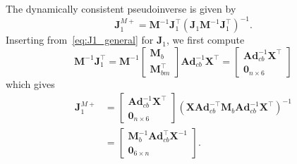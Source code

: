 \documentclass[../main.tex]{subfiles}
\begin{document}
\appendix
\section{}%
The dynamically consistent pseudoinverse is given by
\begin{equation}
    \bm{J}_1^{M+} = \bm{M}^{-1} \bm{J}_1^\top \left( \bm{J}_1 \bm{M}^{-1} \bm{J}_1^\top \right)^{-1}.
\end{equation}
Inserting from~\eqref{eq:J1_general} for $\bm{J}_1$, we first compute 
\begin{equation}
    \! \! \! \bm{M}^{-1} \bm{J}_1^\top = \bm{M}^{-1} \begin{bmatrix}
        \bm{M}_b \\ \bm{M}_{bm}^\top
    \end{bmatrix} \bm{Ad}_{cb}^{-1} \bm{X}^\top = \begin{bmatrix}
        \bm{Ad}_{cb}^{-1} \bm{X}^\top \\ \bm{0}_{n \times 6}
    \end{bmatrix}
\end{equation}
which gives
\begin{equation}
\begin{split}
    \bm{J}_1^{M+} &= \begin{bmatrix}
        \bm{Ad}_{cb}^{-1} \bm{X}^\top \\ \bm{0}_{n \times 6}
    \end{bmatrix} \left( \bm{X} \bm{Ad}_{cb}^{-\top} \bm{M}_b \bm{Ad}_{cb}^{-1} \bm{X}^\top \right)^{-1}\\
    &= \begin{bmatrix}
        \bm{M}_b^{-1} \bm{Ad}_{cb}^{\top} \bm{X}^{-1} \\ \bm{0}_{6 \times n}
    \end{bmatrix} .
\end{split}
\end{equation}


\ifSubfilesClassLoaded{%
  
  
}{}
\end{document}
